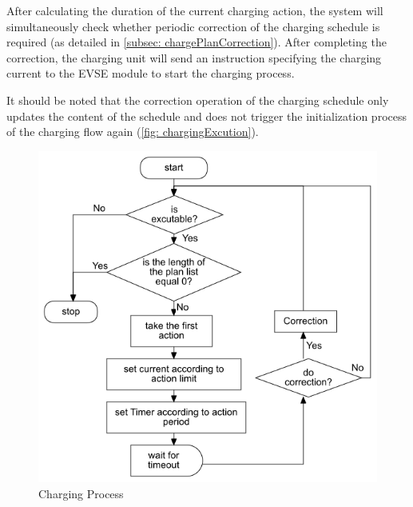 \documentclass[
	english,
	ruledheaders=section,%
	class=report,%
	thesis={type=Report},%
	accentcolor=9c,%
	custommargins=true,%
	marginpar=false,%
	parskip=half-,%
	fontsize=11pt,%
	logofile={img/tuda_logo.pdf}, %
]{tudapub}
\begin{document}
\begin{enumerate}[label=\Alph*.]



    After calculating the duration of the current charging action, the system will simultaneously check whether periodic correction of the charging schedule is required (as detailed in \autoref{subsec: chargePlanCorrection}). After completing the correction, the charging unit will send an instruction specifying the charging current to the EVSE module to start the charging process.

    It should be noted that the correction operation of the charging schedule only updates the content of the schedule and does not trigger the initialization process of the charging flow again (\autoref{fig: chargingExcution}). 
    
    \begin{figure}[H]
        \centering
        \includegraphics[width=0.85\linewidth]{img/ChargingExcution.png}
        \caption{Charging Process}
        \label{fig: chargingExcution}
    \end{figure}
    

\end{enumerate}
\end{document}
